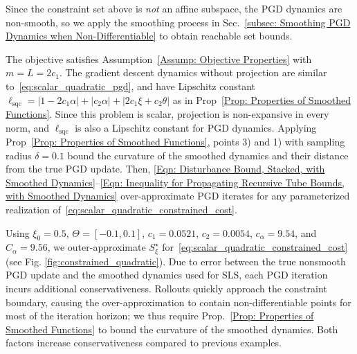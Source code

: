 \documentclass[letterpaper, 10 pt, conference]{ieeeconf}
\newcommand{\?}{\stackrel{?}{=}}
\newcommand{\objSqCons}{J_{\mathrm{sqc}}}
\newcommand{\param}{\theta}
\newcommand{\paramSet}{\Theta}
\newcommand{\paramSetSqc}{\Theta_{\mathrm{sqc}}}
\newcommand{\var}{\xi}
\newcommand{\varOptSet}{S_\var^\star}
\newcommand{\ratePGD}{\alpha}
\newcommand{\ratePGDMin}{c_\ratePGD}
\newcommand{\ratePGDMax}{C_\ratePGD}
\newcommand{\constraintSet}{{S_{\mathcal{C}}}}
\newcommand{\samplingRadius}{\delta}
\newcommand{\SqcQuadScale}{c_1}
\newcommand{\SqcLinScale}{c_2}
\newcommand{\SqcConsVal}{c_3}
\newcommand{\SqcLipschitz}{\ell_{\mathrm{sqc}}}
\begin{document}
Since the constraint 
set above
is \emph{not} an affine subspace, the PGD dynamics are non-smooth, so we apply the smoothing 
process in Sec.~\ref{subsec: Smoothing PGD Dynamics when Non-Differentiable} to obtain 
reachable set bounds.

The objective satisfies Assumption~\ref{Assump: Objective Properties} with $m = L = 2 \SqcQuadScale$.
The gradient descent dynamics without projection are similar to~\eqref{eq:scalar_quadratic_pgd}, and have Lipschitz constant $\SqcLipschitz = \lvert 1 - 2 \SqcQuadScale \ratePGD \rvert + \lvert \SqcLinScale \ratePGD \rvert + \lvert 2 \SqcQuadScale \var + \SqcLinScale \param \rvert$ 
as in Prop~\ref{Prop: Properties of Smoothed Functions}. 
Since this problem is scalar, projection is non-expansive in every norm, and $\SqcLipschitz$ is also a Lipschitz constant for PGD dynamics.
Applying Prop~\ref{Prop: Properties of Smoothed Functions}, points 3) and 1) with sampling radius $\samplingRadius = 0.1$ bound the curvature of the smoothed dynamics and their distance from the true PGD update. 
Then, \eqref{Eqn: Disturbance Bound, Stacked, with Smoothed Dynamics}--\eqref{Eqn: Inequality for Propagating Recursive Tube Bounds, with Smoothed Dynamics} 
over-approximate
PGD iterates for any parameterized realization of~\eqref{eq:scalar_quadratic_constrained_cost}. 

Using $\var_0 = 0.5$, 
$\paramSet = [-0.1, 0.1]$, 
$\SqcQuadScale = 0.0521$, $\SqcLinScale = 0.0054$, $\ratePGDMin = 9.54$, and $\ratePGDMax = 9.56$,
we outer-approximate
$\varOptSet$ for~\eqref{eq:scalar_quadratic_constrained_cost} 
(see Fig. \ref{fig:constrained_quadratic}). 
Due to error between the true nonsmooth PGD update and the smoothed dynamics used for SLS, each PGD iteration incurs additional conservativeness. 
Rollouts
quickly approach the constraint boundary, causing the over-approximation to contain non-differentiable points for 
most
of the iteration horizon;
we thus require
Prop.~\ref{Prop: Properties of Smoothed Functions} to bound the curvature of the smoothed dynamics. 
Both factors increase conservativeness compared to previous examples. 
\end{document}

